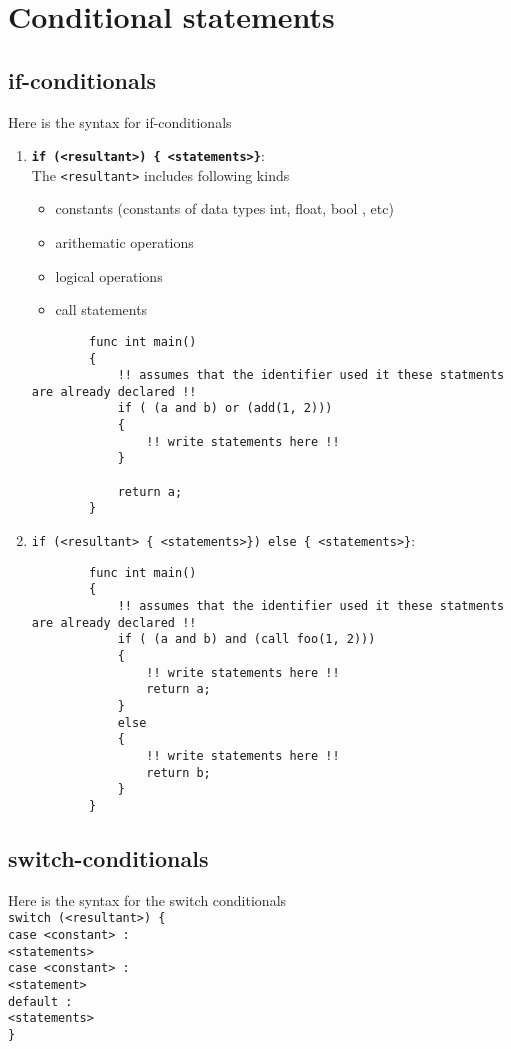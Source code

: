 \documentclass[journal, 18pt]{report}
\begin{document}
\section{Conditional statements}
\subsection{if-conditionals}
Here is the syntax for if-conditionals
\begin{enumerate}
    \item \textbf{\texttt{if (<resultant>) \{ <statements>\}}}:\\
    The \texttt{<resultant>} includes following kinds 
    \begin{itemize}
        \item constants (constants of data types int, float, bool , etc)
        \item arithematic operations
        \item logical operations
        \item call statements
    \end{itemize}
    \begin{lstlisting}
        func int main()
        {
            !! assumes that the identifier used it these statments are already declared !!
            if ( (a and b) or (add(1, 2)))
            {
                !! write statements here !!
            }

            return a;
        }
    \end{lstlisting}
    \item \texttt{\texttt{if (<resultant> \{ <statements>\})} else \{ <statements>\}}:\\
    \begin{lstlisting}
        func int main()
        {
            !! assumes that the identifier used it these statments are already declared !!
            if ( (a and b) and (call foo(1, 2)))
            {
                !! write statements here !!
                return a;
            }
            else 
            {
                !! write statements here !!
                return b;
            }
        }
    \end{lstlisting}
\end{enumerate}
\subsection{switch-conditionals}
Here is the syntax for the switch conditionals\\
\texttt{switch (<resultant>) \{ \\
    case <constant> :\\
        <statements>\\
    case <constant> :\\
        <statement>\\
    default :\\
        <statements>\\
    \}}\\
\end{document}
